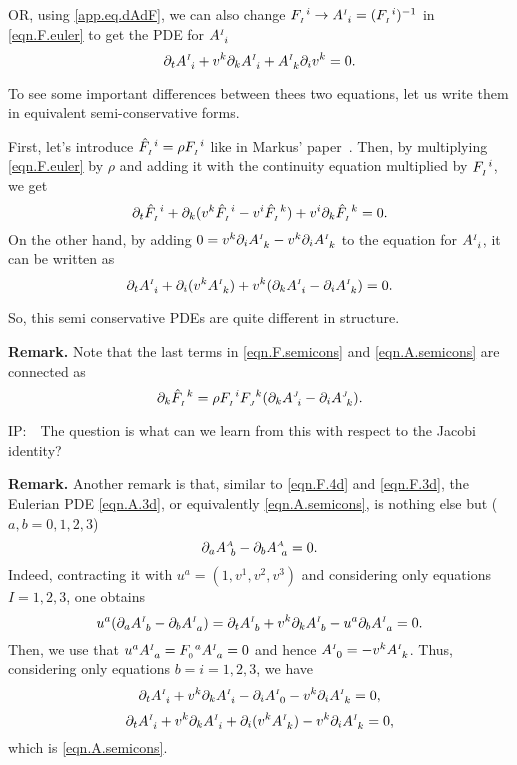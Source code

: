 \documentclass[
10pt, %
a4paper, %
oneside, %
headinclude,footinclude, %
BCOR5mm, %
]{scrartcl}
\newcommand{\IP}[1]{{\color{Red}IP:\ \ #1}}
\newcommand{\pd}{\partial}
\newcommand{\F}[2]{F^{\ #1}_{\mathsmaller#2}}
\newcommand{\hatF}[2]{\hat{F}^{\ #1}_{\mathsmaller#2}}
\newcommand{\A}[2]{A^{\mathsmaller#1}_{\ #2}}
\begin{document}
OR, using \eqref{app.eq.dAdF}, we can also change $ \F{i}{I} \rightarrow \A{I}{i}=(\F{i}{I})^{-1}$ 
in \eqref{eqn.F.euler} to get the PDE for $ \A{I}{i} $
\begin{equation}\label{eqn.A.3d}
\pd_t \A{I}{i} + v^k \pd_k \A{I}{i} + \A{I}{k}\pd_i v^k = 0.
\end{equation}

To see some important differences between thees two equations, let us write them in equivalent 
semi-conservative forms. 

First, let's introduce $ \hatF{i}{I} = \rho \F{i}{I} $ like in Markus' 
paper~\cite{Markus2009}. Then, by multiplying \eqref{eqn.F.euler} by $ \rho $ and adding it with 
the continuity equation multiplied by $ \F{i}{I} $, we get
\begin{equation}\label{eqn.F.semicons}
\pd_t\hatF{i}{I} + \pd_k (v^k \hatF{i}{I} - v^i \hatF{k}{I}) + v^i \pd_k\hatF{k}{I} = 0.
\end{equation}
On the other hand, by adding $ 0 = v^k\pd_i\A{I}{k} - v^k\pd_i\A{I}{k} $ to the equation for $ 
\A{I}{i} $, it can be written as
\begin{equation}\label{eqn.A.semicons}
\pd_t \A{I}{i} + \pd_i (v^k \A{I}{k}) + v^k (\pd_k \A{I}{i} - \pd_i \A{I}{k})  = 0.
\end{equation}

So, this semi conservative PDEs are quite different in structure.

\textbf{Remark.} Note that the last terms in \eqref{eqn.F.semicons} and \eqref{eqn.A.semicons} are 
connected as
\begin{equation}
\pd_k \hatF{k}{I} = \rho \F{i}{I}\F{k}{J}(\pd_k \A{J}{i} - \pd_i \A{J}{k}).
\end{equation}

\IP{The question is what can we learn from this with respect to the Jacobi identity?}


\textbf{Remark.} Another remark is that, similar to \eqref{eqn.F.4d} and \eqref{eqn.F.3d}, the 
Eulerian PDE \eqref{eqn.A.3d}, or equivalently \eqref{eqn.A.semicons}, is nothing else but ($ 
a,b=0,1,2,3 $)
\begin{equation}\label{eqn.A.4d}
\pd_a \A{A}{b} - \pd_b \A{A}{a} = 0.
\end{equation}
Indeed, contracting it with $ u^a = (1,v^1,v^2,v^3) $ and considering only equations $ I=1,2,3 $, 
one obtains
\begin{equation}
u^a(\pd_a \A{I}{b} - \pd_b \A{I}{a}) = \pd_t \A{I}{b} + v^k\pd_k \A{I}{b} - u^a\pd_b \A{I}{a} = 0.
\end{equation}
Then, we use that $ u^a\A{I}{a} = \F{a}{0}\A{I}{a} = 0 $ and hence $ \A{I}{0} = -v^k \A{I}{k} $.
Thus, considering only equations $ b=i=1,2,3 $, we have
\begin{equation}
\pd_t \A{I}{i} + v^k\pd_k \A{I}{i} - \pd_i \A{I}{0} - v^k\pd_i \A{I}{k} = 0,
\end{equation}
\begin{equation}
\pd_t \A{I}{i} + v^k\pd_k \A{I}{i} + \pd_i (v^k \A{I}{k}) - v^k\pd_i \A{I}{k} = 0,
\end{equation}
which is \eqref{eqn.A.semicons}.
\end{document}
